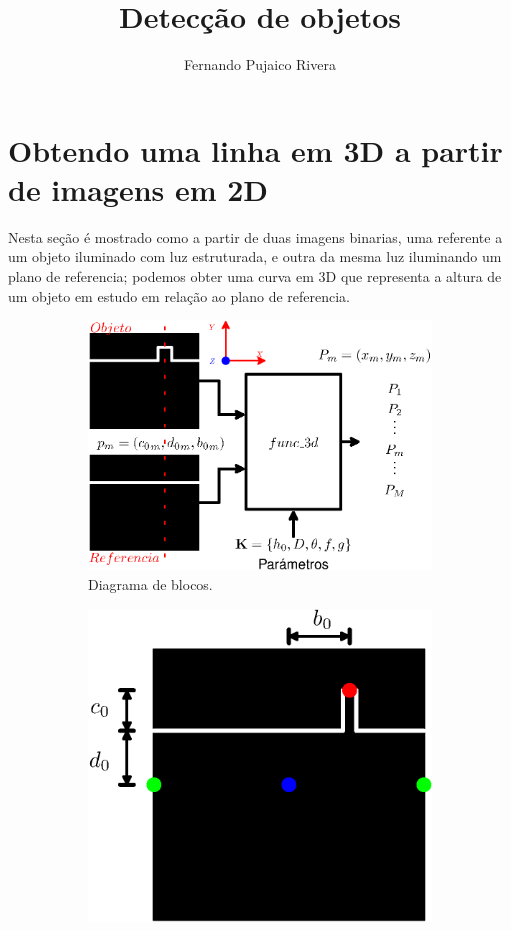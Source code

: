 \documentclass[12pt]{article}
\title{Detecção de objetos }
\author{Fernando Pujaico Rivera}
\date{}
\begin{document}
\maketitle


\section{Obtendo uma linha em 3D a partir de imagens em 2D}
Nesta seção é mostrado como a partir de duas imagens binarias, 
uma referente a um objeto iluminado com luz estruturada,
e outra da mesma luz iluminando um plano de referencia;
podemos obter uma curva em 3D que representa a altura de um objeto em estudo em relação
ao plano de referencia.
\begin{figure}[!h]
     \centering
     \begin{subfigure}[b]{0.5\textwidth}
         \centering
         \includegraphics[width=\textwidth]{Diagrama3.eps}
         \caption{Diagrama de blocos.}
         \label{fig:blocos:sys}
     \end{subfigure}
     \hfill
     \begin{subfigure}[b]{0.425\textwidth}
         \centering
         \includegraphics[width=\textwidth]{Diagrama2.eps}

\end{subfigure}
\end{figure}
\end{document}
